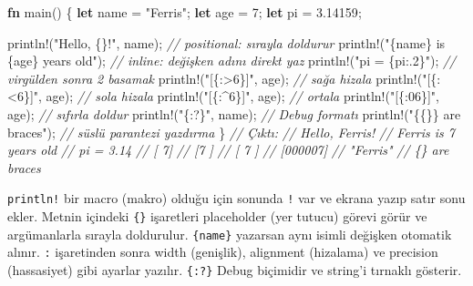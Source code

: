 \documentclass[12pt,a4paper]{article}
\newenvironment{Shaded}{}{}
\newcommand{\CommentTok}[1]{\textcolor[rgb]{0.38,0.63,0.69}{\textit{#1}}}
\newcommand{\DecValTok}[1]{\textcolor[rgb]{0.25,0.63,0.44}{#1}}
\newcommand{\FloatTok}[1]{\textcolor[rgb]{0.25,0.63,0.44}{#1}}
\newcommand{\FunctionTok}[1]{\textcolor[rgb]{0.02,0.16,0.49}{#1}}
\newcommand{\KeywordTok}[1]{\textcolor[rgb]{0.00,0.44,0.13}{\textbf{#1}}}
\newcommand{\NormalTok}[1]{#1}
\newcommand{\OperatorTok}[1]{\textcolor[rgb]{0.40,0.40,0.40}{#1}}
\newcommand{\StringTok}[1]{\textcolor[rgb]{0.25,0.44,0.63}{#1}}
\begin{document}
\begin{Shaded}
\begin{Highlighting}[]
\KeywordTok{fn} \FunctionTok{main}\OperatorTok{()} \OperatorTok{\{}
    \KeywordTok{let}\NormalTok{ name }\OperatorTok{=} \StringTok{"Ferris"}\OperatorTok{;}
    \KeywordTok{let}\NormalTok{ age }\OperatorTok{=} \DecValTok{7}\OperatorTok{;}
    \KeywordTok{let}\NormalTok{ pi }\OperatorTok{=} \FloatTok{3.14159}\OperatorTok{;}

\NormalTok{    println}\OperatorTok{!(}\StringTok{"Hello, \{\}!"}\OperatorTok{,}\NormalTok{ name}\OperatorTok{);}        \CommentTok{// positional: sırayla doldurur}
\NormalTok{    println}\OperatorTok{!(}\StringTok{"\{name\} is \{age\} years old"}\OperatorTok{);} \CommentTok{// inline: değişken adını direkt yaz}
\NormalTok{    println}\OperatorTok{!(}\StringTok{"pi = \{pi:.2\}"}\OperatorTok{);}            \CommentTok{// virgülden sonra 2 basamak}
\NormalTok{    println}\OperatorTok{!(}\StringTok{"[\{:\textgreater{}6\}]"}\OperatorTok{,}\NormalTok{ age}\OperatorTok{);}            \CommentTok{// sağa hizala}
\NormalTok{    println}\OperatorTok{!(}\StringTok{"[\{:\textless{}6\}]"}\OperatorTok{,}\NormalTok{ age}\OperatorTok{);}            \CommentTok{// sola hizala}
\NormalTok{    println}\OperatorTok{!(}\StringTok{"[\{:\^{}6\}]"}\OperatorTok{,}\NormalTok{ age}\OperatorTok{);}            \CommentTok{// ortala}
\NormalTok{    println}\OperatorTok{!(}\StringTok{"[\{:06\}]"}\OperatorTok{,}\NormalTok{ age}\OperatorTok{);}            \CommentTok{// sıfırla doldur}
\NormalTok{    println}\OperatorTok{!(}\StringTok{"\{:?\}"}\OperatorTok{,}\NormalTok{ name}\OperatorTok{);}              \CommentTok{// Debug formatı}
\NormalTok{    println}\OperatorTok{!(}\StringTok{"\{\{\}\} are braces"}\OperatorTok{);}         \CommentTok{// süslü parantezi yazdırma}
\OperatorTok{\}}
\CommentTok{// Çıktı:}
\CommentTok{// Hello, Ferris!}
\CommentTok{// Ferris is 7 years old}
\CommentTok{// pi = 3.14}
\CommentTok{// [     7]}
\CommentTok{// [7     ]}
\CommentTok{// [  7   ]}
\CommentTok{// [000007]}
\CommentTok{// "Ferris"}
\CommentTok{// \{\} are braces}
\end{Highlighting}
\end{Shaded}

\texttt{println!} bir macro (makro) olduğu için sonunda \texttt{!} var ve ekrana yazıp satır sonu ekler. Metnin içindeki \texttt{\{\}} işaretleri placeholder (yer tutucu) görevi görür ve argümanlarla sırayla doldurulur. \texttt{\{name\}} yazarsan aynı isimli değişken otomatik alınır. \texttt{:} işaretinden sonra width (genişlik), alignment (hizalama) ve precision (hassasiyet) gibi ayarlar yazılır. \texttt{\{:?\}} Debug biçimidir ve string'i tırnaklı gösterir.
\end{document}
